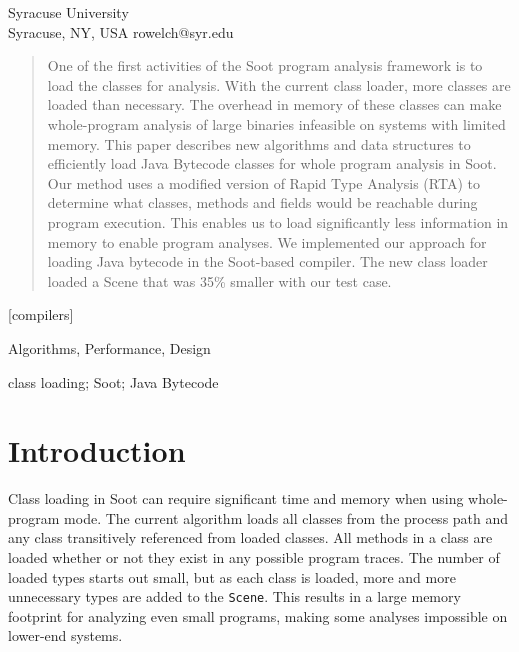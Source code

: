 \documentclass{sigplanconf}
\begin{document}
           {Syracuse University\\Syracuse, NY, USA}
           {rowelch@syr.edu}       
    
           

\maketitle

\begin{abstract}
One of the first activities of the Soot program analysis framework is to load 
the classes for analysis. With the current class loader, more classes are loaded
than necessary. The overhead in memory of these classes can make whole-program 
analysis of large binaries infeasible on systems with limited memory. This paper 
describes new algorithms and data structures to efficiently load Java
Bytecode classes for whole program analysis in Soot. Our method uses a modified 
version of Rapid Type Analysis (RTA) to determine what classes, methods and 
fields would be reachable during program execution. This enables us to load 
significantly less information in memory to enable program analyses.
We implemented our approach for loading Java bytecode in the Soot-based \rb 
compiler. The new class loader loaded a Scene that was 35\% smaller with
our test case.
\end{abstract}

[compilers]

\terms
Algorithms, Performance, Design

\keywords
class loading; Soot; Java Bytecode

\section{Introduction}
\label{sec:intro}
Class loading in Soot \cite{soot-retro, soot-orig} can require significant time 
and memory when using whole-program mode. The current algorithm loads all 
classes from the process path and any class transitively referenced from loaded 
classes. All methods in a class are loaded whether or not they exist in any 
possible program traces. The number of loaded types starts out small, but as 
each class is loaded, more and more unnecessary types are added to the {\tt Scene}. 
This results in a large memory footprint for analyzing even small programs, 
making some analyses impossible on lower-end systems.
\end{document}
